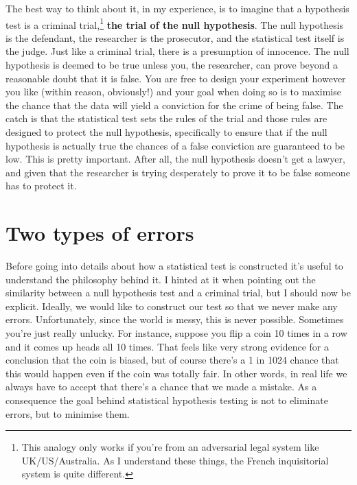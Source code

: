 \documentclass[
  a4paper,
]{book}
\begin{document}
The best way to think about it, in my experience, is to imagine that a
hypothesis test is a criminal trial,\footnote{This analogy only works if
  you're from an adversarial legal system like UK/US/Australia. As I
  understand these things, the French inquisitorial system is quite
  different.} \textbf{the trial of the null hypothesis}. The null
hypothesis is the defendant, the researcher is the prosecutor, and the
statistical test itself is the judge. Just like a criminal trial, there
is a presumption of innocence. The null hypothesis is deemed to be true
unless you, the researcher, can prove beyond a reasonable doubt that it
is false. You are free to design your experiment however you like
(within reason, obviously!) and your goal when doing so is to maximise
the chance that the data will yield a conviction for the crime of being
false. The catch is that the statistical test sets the rules of the
trial and those rules are designed to protect the null hypothesis,
specifically to ensure that if the null hypothesis is actually true the
chances of a false conviction are guaranteed to be low. This is pretty
important. After all, the null hypothesis doesn't get a lawyer, and
given that the researcher is trying desperately to prove it to be false
someone has to protect it.

\hypertarget{two-types-of-errors}{%
\section{Two types of errors}\label{two-types-of-errors}}

Before going into details about how a statistical test is constructed
it's useful to understand the philosophy behind it. I hinted at it when
pointing out the similarity between a null hypothesis test and a
criminal trial, but I should now be explicit. Ideally, we would like to
construct our test so that we never make any errors. Unfortunately,
since the world is messy, this is never possible. Sometimes you're just
really unlucky. For instance, suppose you flip a coin 10 times in a row
and it comes up heads all 10 times. That feels like very strong evidence
for a conclusion that the coin is biased, but of course there's a 1 in
1024 chance that this would happen even if the coin was totally fair. In
other words, in real life we always have to accept that there's a chance
that we made a mistake. As a consequence the goal behind statistical
hypothesis testing is not to eliminate errors, but to minimise them.
\end{document}
